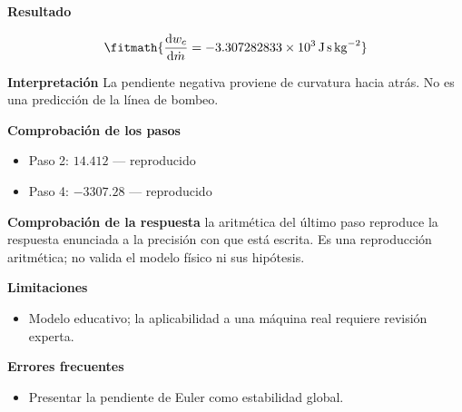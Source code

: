 \documentclass[10pt,openany]{book}
\begin{document}
\begin{tcolorbox}[title={Problema resuelto 3}, studiumworked, breakable]
\noindent\textbf{Resultado}

\[
\fitmath{\frac{\mathrm{d}w_c}{\mathrm{d}\dot{m}}=-3.307282833\times10^{3}\,\mathrm{J}\,\mathrm{s}\,\mathrm{kg}^{-2}}
\]

\noindent\textbf{Interpretación}
La pendiente negativa proviene de curvatura hacia atrás. No es una predicción de la línea de bombeo.

\noindent\textbf{Comprobación de los pasos}
\begin{itemize}
\item Paso 2: $14.412$ — reproducido
\item Paso 4: $-3307.28$ — reproducido
\end{itemize}

\noindent\textbf{Comprobación de la respuesta} la aritmética del último paso reproduce la respuesta enunciada a la precisión con que está escrita. Es una reproducción aritmética; no valida el modelo físico ni sus hipótesis.

\noindent\textbf{Limitaciones}
\begin{itemize}
\item Modelo educativo; la aplicabilidad a una máquina real requiere revisión experta.
\end{itemize}

\noindent\textbf{Errores frecuentes}
\begin{itemize}
\item Presentar la pendiente de Euler como estabilidad global.
\end{itemize}
\end{tcolorbox}
\end{document}
